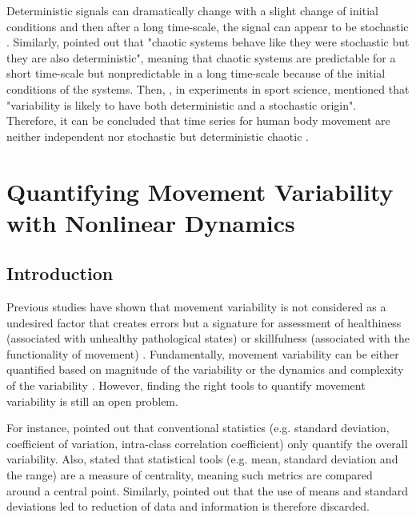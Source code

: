 Deterministic signals can dramatically change with a slight change 
of initial conditions and then after a long time-scale, the signal can 
appear to be stochastic \citep{amato1992}. Similarly, 
\citealt[p. 11]{klonowski2007} pointed out that "chaotic systems behave 
like they were stochastic but they are also deterministic", meaning that 
chaotic systems are predictable for a short time-scale but nonpredictable 
in a long time-scale because of the initial conditions of the systems. 
Then, \citealt[p. 78]{preatoni2013}, in experiments in sport science, mentioned 
that "variability is likely to have both deterministic and a 
stochastic origin". Therefore, it can be concluded that time series for 
human body movement are neither independent nor stochastic but 
deterministic chaotic \citep{stergiou2006, harbourne2009, stergiou2011}.


\section{Quantifying Movement Variability with Nonlinear Dynamics}


\subsection{Introduction}
Previous studies have shown that movement variability is not considered 
as a undesired factor that creates errors but a signature for 
assessment of healthiness (associated with unhealthy pathological states) 
or skillfulness (associated with the functionality of movement) 
\citep{stergiou2011}. Fundamentally, movement variability can be either 
quantified based on magnitude of the variability or the dynamics and 
complexity of the variability \citep{caballero2014}. However, finding 
the right tools to quantify movement variability is still an open problem. 

For instance,
\cite{preatoni2010, preatoni2013} pointed 
out that conventional statistics (e.g. standard deviation, coefficient 
of variation, intra-class correlation coefficient) only quantify 
the overall variability.
Also, \cite{stergiou2011} stated that statistical tools 
(e.g. mean, standard deviation and the range) are a measure of centrality,
meaning such metrics are compared around a central point. Similarly, 
\cite{coffey2011} pointed out that the use of means and standard deviations 
led to reduction of data and information is therefore discarded.

